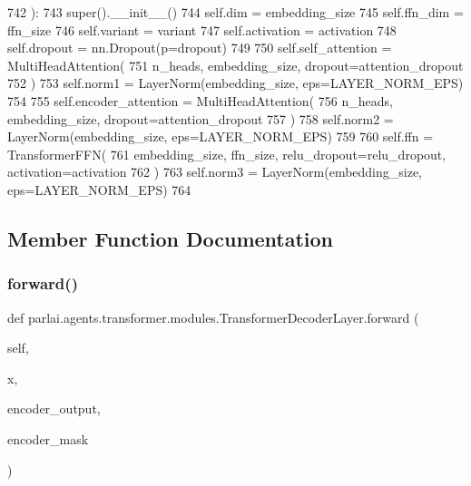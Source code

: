 \begin{DoxyCode}
742     ):
743         super().\_\_init\_\_()
744         self.dim = embedding\_size
745         self.ffn\_dim = ffn\_size
746         self.variant = variant
747         self.activation = activation
748         self.dropout = nn.Dropout(p=dropout)
749 
750         self.self\_attention = MultiHeadAttention(
751             n\_heads, embedding\_size, dropout=attention\_dropout
752         )
753         self.norm1 = LayerNorm(embedding\_size, eps=LAYER\_NORM\_EPS)
754 
755         self.encoder\_attention = MultiHeadAttention(
756             n\_heads, embedding\_size, dropout=attention\_dropout
757         )
758         self.norm2 = LayerNorm(embedding\_size, eps=LAYER\_NORM\_EPS)
759 
760         self.ffn = TransformerFFN(
761             embedding\_size, ffn\_size, relu\_dropout=relu\_dropout, activation=activation
762         )
763         self.norm3 = LayerNorm(embedding\_size, eps=LAYER\_NORM\_EPS)
764 
\end{DoxyCode}


\subsection{Member Function Documentation}
\mbox{\label{classparlai_1_1agents_1_1transformer_1_1modules_1_1TransformerDecoderLayer_ad0a63d90190682d0f9ff325fcf60f426}} 
\subsubsection{\texorpdfstring{forward()}{forward()}}
{\footnotesize\ttfamily def parlai.\+agents.\+transformer.\+modules.\+Transformer\+Decoder\+Layer.\+forward (\begin{DoxyParamCaption}\item[{}]{self,  }\item[{}]{x,  }\item[{}]{encoder\+\_\+output,  }\item[{}]{encoder\+\_\+mask }\end{DoxyParamCaption})}

